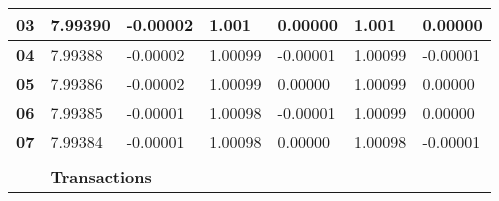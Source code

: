 \documentclass[../NFTComp_IEEE.tex]{subfiles}
\begin{document}
\begin{table}[ht]
{\begin{tabular}{lllllll}
            \multicolumn{1}{|l|}{\textbf{03}}                  & \multicolumn{1}{l|}{7.99390}                                                       & \multicolumn{1}{l|}{-0.00002}           & \multicolumn{1}{l|}{1.001}              & \multicolumn{1}{l|}{0.00000}    & \multicolumn{1}{l|}{1.001}   & \multicolumn{1}{l|}{0.00000}    \\ \hline
            \multicolumn{1}{|l|}{\textbf{04}}                  & \multicolumn{1}{l|}{7.99388}                                                       & \multicolumn{1}{l|}{-0.00002}           & \multicolumn{1}{l|}{1.00099}            & \multicolumn{1}{l|}{-0.00001}   & \multicolumn{1}{l|}{1.00099} & \multicolumn{1}{l|}{-0.00001}   \\ \hline
            \multicolumn{1}{|l|}{\textbf{05}}                  & \multicolumn{1}{l|}{7.99386}                                                       & \multicolumn{1}{l|}{-0.00002}           & \multicolumn{1}{l|}{1.00099}            & \multicolumn{1}{l|}{0.00000}    & \multicolumn{1}{l|}{1.00099} & \multicolumn{1}{l|}{0.00000}    \\ \hline
            \multicolumn{1}{|l|}{\textbf{06}}                  & \multicolumn{1}{l|}{7.99385}                                                       & \multicolumn{1}{l|}{-0.00001}           & \multicolumn{1}{l|}{1.00098}            & \multicolumn{1}{l|}{-0.00001}   & \multicolumn{1}{l|}{1.00099} & \multicolumn{1}{l|}{0.00000}    \\ \hline
            \multicolumn{1}{|l|}{\textbf{07}}                  & \multicolumn{1}{l|}{7.99384}                                                       & \multicolumn{1}{l|}{-0.00001}           & \multicolumn{1}{l|}{1.00098}            & \multicolumn{1}{l|}{0.00000}    & \multicolumn{1}{l|}{1.00098} & \multicolumn{1}{l|}{-0.00001}   \\ \hline
                                                               &                                                                                    &                                         &                                         &                                 &                              &
            \\
            \cline{2-7}
            \multicolumn{1}{c|}{}                              & \multicolumn{6}{l|}{\textbf{Transactions}}                                                                                                                                                                                                                                \\ \cline{2-7}

\end{tabular}}
\end{table}
\end{document}
